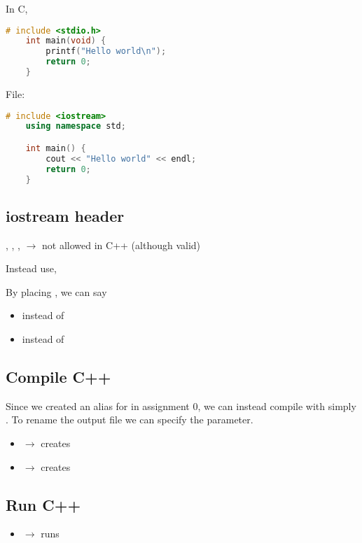 In C,
\begin{lstlisting}[language = C]
    # include <stdio.h>
    int main(void) {
        printf("Hello world\n");
        return 0;
    }
\end{lstlisting}
File: 
\begin{lstlisting}[language = C++]
    # include <iostream>
    using namespace std;

    int main() {
        cout << "Hello world" << endl;
        return 0;
    }
\end{lstlisting}

\subsection{iostream header}

, , , 
$ \rightarrow $ not allowed in C++ (although valid)

Instead use, 

By placing , we can say
\begin{itemize}
      \item {} instead of 
      \item {} instead of 
\end{itemize}

\subsection{Compile C++}
Since we created an alias for  in assignment 0, we can instead
compile with simply . To rename the output file
we can specify the  parameter.
\begin{itemize}
      \item {} $ \rightarrow $ creates 
      \item {} $ \rightarrow $ creates 
\end{itemize}

\subsection{Run C++}
\begin{itemize}
      \item {} $ \rightarrow $ runs 
\end{itemize}

